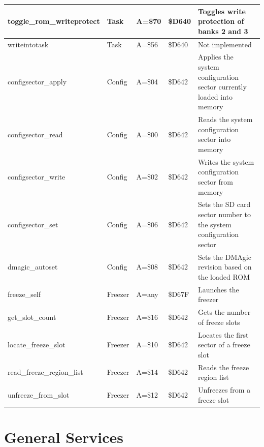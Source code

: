 \begin{longtable}{|L{4cm}|p{1.5cm}|L{1.5cm}|L{1.5cm}|L{4cm}|}
\hline
toggle\_rom\_writeprotect & Task & A=\$70 & \$D640 & Toggles write protection of banks 2 and 3 \\
\hline
writeintotask & Task & A=\$56 & \$D640 & Not implemented \\
\hline
configsector\_apply & Config & A=\$04 & \$D642 & Applies the system configuration sector currently loaded into memory \\
\hline
configsector\_read & Config  & A=\$00 & \$D642 & Reads the system configuration sector into memory \\
\hline
configsector\_write & Config & A=\$02 & \$D642 & Writes the system configuration sector from memory \\
\hline
configsector\_set & Config & A=\$06 & \$D642 & Sets the SD card sector number to the system configuration sector \\
\hline
dmagic\_autoset & Config & A=\$08 & \$D642 & Sets the DMAgic revision based on the loaded ROM \\
\hline
freeze\_self & Freezer & A=any & \$D67F & Launches the freezer \\
\hline
get\_slot\_count & Freezer & A=\$16 & \$D642 & Gets the number of freeze slots \\
\hline
locate\_freeze\_slot & Freezer & A=\$10 & \$D642 & Locates the first sector of a freeze slot \\
\hline
read\_freeze\_region\_list & Freezer & A=\$14 & \$D642 & Reads the freeze region list \\
\hline
unfreeze\_from\_slot & Freezer & A=\$12 & \$D642 & Unfreezes from a freeze slot \\
\hline
\end{longtable}


\newpage
\section{General Services}


